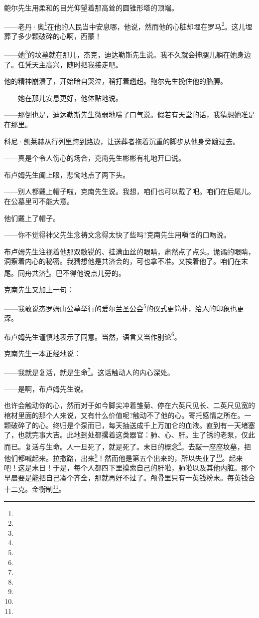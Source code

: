 \par 鲍尔先生用柔和的目光仰望着那高耸的圆锥形塔的顶端。
\par ——老丹·奥\footnote{}在他的人民当中安息哪，他说，然而他的心脏却埋在罗马\footnote{}。这儿埋葬了多少颗破碎的心啊，西蒙！
\par ——她\footnote{}的坟墓就在那儿，杰克，迪达勒斯先生说。我不久就会抻腿儿躺在她身边了。任凭天主高兴，随时把我接走吧。
\par 他的精神崩溃了，开始暗自哭泣，稍打着趔趄。鲍尔先生挽住他的胳膊。
\par ——她在那儿安息更好，他体贴地说。
\par ——那倒也是，迪达勒斯先生微弱地喘了口气说。假若有天堂的话，我猜想她准是在那里。
\par 科尼·凯莱赫从行列里跨到路边，让送葬者拖着沉重的脚步从他身旁踱过去。
\par ——真是个令人伤心的场合，克南先生彬彬有礼地开口说。
\par 布卢姆先生阖上眼，悲恸地点了两下头。
\par ——别人都戴上帽子啦，克南先生说。我想，咱们也可以戴了吧。咱们在后尾儿。在公墓里可不能大意。
\par 他们戴上了帽子。
\par ——你不觉得神父先生念祷文念得太快了些吗?克南先生用嗔怪的口吻说。
\par 布卢姆先生注视着他那双敏锐的、挂满血丝的眼睛，肃然点了点头。诡谲的眼睛，洞察着内心的秘密。我猜想他是共济会的，可也拿不准。又挨着他了。咱们在末尾。同舟共济\footnote{}。巴不得他说点儿旁的。
\par 克南先生又加上一句：
\par ——我敢说杰罗姆山公墓举行的爱尔兰圣公会\footnote{}的仪式更简朴，给人的印象也更深。
\par 布卢姆先生谨慎地表示了同意。当然，语言又当作别论\footnote{}。
\par 克南先生一本正经地说：
\par ——我就是复活，就是生命\footnote{}。这话触动人的内心深处。
\par ——是啊，布卢姆先生说。
\par 也许会触动你的心，然而对于如今脚尖冲着雏菊、停在六英尺见长、二英尺见宽的棺材里面的那个人来说，又有什么价值呢?触动不了他的心。寄托感情之所在。一颗破碎了的心。终归是个泵而已，每天抽送成千上万加仑的血液。直到有一天堵塞了，也就完事大吉。此地到处都撂着这类器官：肺、心、肝。生了锈的老泵，仅此而已。复活与生命。人一旦死了，就是死了。末日的概念\footnote{}。去敲一座座坟墓，把他们都喊起来。拉撒路，出来\footnote{}！然而他是第五个出来的，所以失业了\footnote{}。起来吧！这是末日！于是，每个人都四下里摸索自己的肝啦，肺啦以及其他内脏。那个早晨要是能把自己凑个齐全，那就再好不过了。颅骨里只有一英钱粉末。每英钱合十二克。金衡制\footnote{}。
